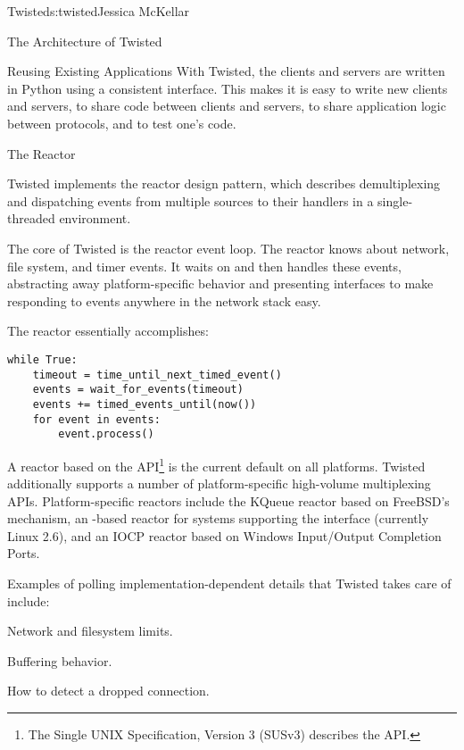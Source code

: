 \begin{aosachapter}{Twisted}{s:twisted}{Jessica McKellar}
\begin{aosasect1}{The Architecture of Twisted}
\begin{aosasect2}{Reusing Existing Applications}
With Twisted, the clients and servers are written in Python using a
consistent interface. This makes it is easy to write new clients and servers, to
share code between clients and servers, to share application logic between
protocols, and to test one's code.

\end{aosasect2}

\begin{aosasect2}{The Reactor}

Twisted implements the reactor design pattern, which describes demultiplexing
and dispatching events from multiple sources to their handlers in a
single-threaded environment.

The core of Twisted is the reactor event loop. The reactor knows about network,
file system, and timer events. It waits on and then handles these events,
abstracting away platform-specific behavior and presenting interfaces to make
responding to events anywhere in the network stack easy.

The reactor essentially accomplishes:

\begin{verbatim}
while True:
    timeout = time_until_next_timed_event()
    events = wait_for_events(timeout)
    events += timed_events_until(now())
    for event in events:
        event.process()
\end{verbatim}

A reactor based on the  API\footnote{The Single UNIX
  Specification, Version 3 (SUSv3) describes the  API.} is
the current default on all platforms. Twisted additionally supports a
number of platform-specific high-volume multiplexing
APIs. Platform-specific reactors include the KQueue reactor based on
FreeBSD's  mechanism, an -based reactor for
systems supporting the  interface (currently Linux 2.6),
and an IOCP reactor based on Windows Input/Output Completion Ports.

Examples of polling implementation-dependent details that Twisted takes care
of include:

\begin{aosaitemize}

\item Network and filesystem limits.

\item Buffering behavior.

\item How to detect a dropped connection.


\end{aosaitemize}
\end{aosasect2}
\end{aosasect1}
\end{aosachapter}
